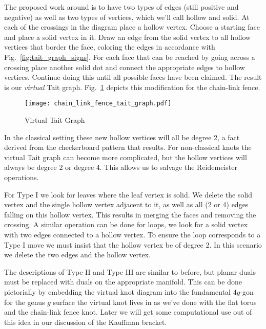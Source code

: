         \par\hfill\par
        The proposed work around is to have two types of edges (still positive
        and negative) as well as two types of vertices, which we'll call
        hollow and solid. At each of the crossings in the diagram place a
        hollow vertex. Choose a starting face and place a solid vertex in it.
        Draw an edge from the solid vertex to all hollow vertices that border
        the face, coloring the edges in accordance with
        Fig.~\ref{fig:tait_graph_signs}. For each face that can be reached
        by going across a crossing place another solid dot and connect the
        appropriate edges to hollow vertices. Continue doing this until all
        possible faces have been claimed. The result is our
        \textit{virtual} Tait graph. Fig.~\ref{fig:chain_link_fence_tait_graph}
        depicts this modification for the chain-link fence.
        \begin{figure}
            \centering
            \texttt{[image: chain\_link\_fence\_tait\_graph.pdf]}
            \caption{Virtual Tait Graph}
            \label{fig:chain_link_fence_tait_graph}
        \end{figure}
        \par\hfill\par
        In the classical setting these new hollow vertices will all be
        degree 2, a fact derived from the checkerboard pattern that results.
        For non-classical knots the virtual Tait graph can become more
        complicated, but the hollow vertices will always be degree 2 or
        degree 4. This allows us to salvage the Reidemeister operations.
        \par\hfill\par
        For Type I we look for leaves where the leaf vertex is solid. We
        delete the solid vertex and the single hollow vertex adjacent to it,
        as well as all (2 or 4) edges falling on this hollow vertex. This
        results in merging the faces and removing the crossing. A similar
        operation can be done for loops, we look for a solid vertex with two
        edges connected to a hollow vertex. To ensure the loop
        corresponds to a Type I move we must insist that the hollow vertex be
        of degree 2. In this scenario we delete the two edges and the hollow
        vertex.
        \par\hfill\par
        The descriptions of Type II and Type III are similar to before, but
        planar duals must be replaced with duals on the appropriate manifold.
        This can be done pictorially by embedding the virtual knot diagram into
        the fundamental $4g$-gon for the genus $g$ surface the virtual knot
        lives in as we've done with the flat torus and the
        chain-link fence knot. Later we will get some computational use out of
        this idea in our discussion of the Kauffman bracket.
